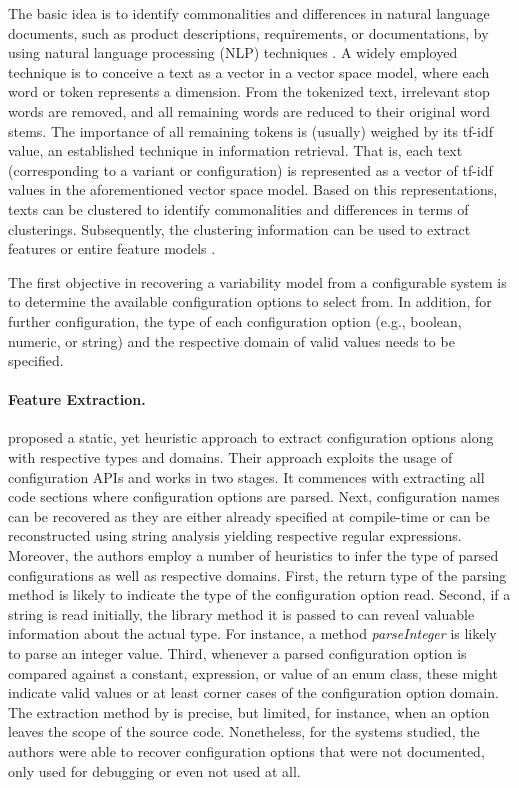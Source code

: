 The basic idea is to identify commonalities and differences in natural language
documents, such as product descriptions, requirements, or documentations, by
using natural language processing (NLP) techniques \citep{bakar_feature_2015}. A
widely employed technique is to conceive a text as a vector in a vector space model, where each word or
token represents a dimension. From the tokenized text, irrelevant stop words
are removed, and all remaining words are reduced to their original word stems.
The importance of all remaining tokens is (usually) weighed by its tf-idf
value, an established technique in information retrieval. That is, each text
(corresponding to a variant or configuration) is represented as a vector of
tf-idf values in the aforementioned vector space model. Based on this
representations, texts can be clustered to identify commonalities and
differences in terms of clusterings. Subsequently, the clustering information
can be used to extract features or entire feature
models \cite{alves_exploratory_2008,bakar_feature_2015}.

The first objective in recovering a variability model from a configurable
system is to determine the available configuration options to select
from. In addition, for further configuration, the type of each configuration
option (e.g., boolean, numeric, or string) and the respective domain of valid
values needs to be specified.

\paragraph{Feature Extraction.} \cite{rabkin_static_2011} proposed a static, yet
heuristic approach to extract configuration options along with respective types and domains. Their approach
exploits the usage of configuration APIs and works
in two stages. It commences with extracting all code sections where
configuration options are parsed. Next, configuration names can be
recovered as they are either already specified at compile-time or can be
reconstructed using string analysis yielding respective regular expressions.
Moreover, the authors employ a number of heuristics to infer the type of parsed
configurations as well as respective domains. First, the return type of the
parsing method is likely to indicate the type of the configuration option read.
Second, if a string is read initially, the library method it is passed to can
reveal valuable information about the actual type. For instance, a method
\emph{parseInteger} is likely to parse an integer value. Third, whenever a
parsed configuration option is compared against a constant, expression, or value
of an enum class, these might indicate valid values or at least corner cases of
the configuration option domain. The extraction method by
\cite{rabkin_static_2011} is precise, but limited, for instance, when an
option leaves the scope of the source code.
Nonetheless, for the systems studied, the authors were able to recover
configuration options that were not documented, only used for debugging or even not used at
all.

